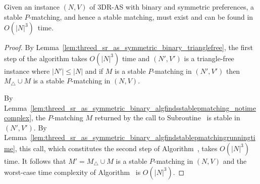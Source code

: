 \begin{thm}
\label{thm:threed_sr_as_symmetric_binary_construction}
Given an instance $(N, V)$ of 3DR-AS with binary and symmetric preferences, a stable $P$\nobreakdash-matching, and hence a stable matching, must exist and can be found in $O(|N|^3)$~time.
\end{thm}
\begin{proof}
By Lemma~\ref{lem:threed_sr_as_symmetric_binary_trianglefree}, the first step of the algorithm takes $O(|N|^3)$ time and $(N', V')$ is a triangle-free instance where $|N'| \leq |N|$ and if $M$ is a stable $P$\nobreakdash-matching in $(N', V')$ then $M_{\triangle} \cup M$ is a stable $P$\nobreakdash-matching in $(N, V)$.

By Lemma~\ref{lem:threed_sr_as_symmetric_binary_algfindsstablepmatching_notimecomplex}, the $P$\nobreakdash-matching $M$ returned by the call to Subroutine~ is stable in $(N', V')$. By Lemma~\ref{lem:threed_sr_as_symmetric_binary_algfindstablepmatchingrunningtime}, this call, which constitutes the second step of Algorithm~, takes $O(|N|^3)$ time. It follows that $M' = M_{\triangle} \cup M$ is a stable $P$\nobreakdash-matching in $(N, V)$ and the worst-case time complexity of Algorithm~ is $O(|N|^3)$.
\end{proof}